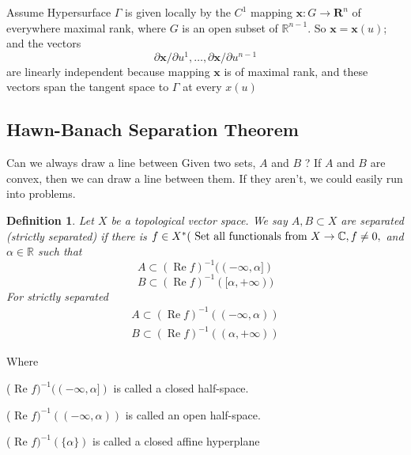 \documentclass[oneside]{book}
\newtheorem{mydef}{Definition}
\begin{document}
    
    
       Assume  Hypersurface $\Gamma$ is given locally by the $C^{1}$ mapping $\mathbf{x}: G \rightarrow \mathbf{R}^{n}$ of everywhere
maximal rank, where $G$ is an open subset of $\mathbb{R}^{n-1} .$ So $\mathbf{x}=\mathbf{x}(u)$; and the vectors \\
$$
\partial \mathbf{x} / \partial u^{1}, \ldots, \partial \mathbf{x} / \partial u^{n-1} 
$$
are linearly independent because  mapping $\mathbf{x}$ is of maximal rank, and these vectors span the tangent space to $\Gamma$ at every $x(u)$\\

\subsection{Hawn-Banach Separation Theorem}
\label{ss:11}
 Can we always draw a line between Given two sets, $ A$ and $ B$ ?
  If $ A$ and $ B$ are convex, then we can draw a line between them. If they aren't, we could easily run into problems.









\begin{mydef} 
Let $X$ be a topological vector space. We say $A, B \subset X$ are separated (strictly separated) if there is $f \in X^{*}(\text{ Set  all functionals from } \newline
 X \rightarrow \mathbb{C}, f \neq 0,$ and $\alpha \in \mathbb{R}$ such that
\[
A \subset(\operatorname{Re} f)^{-1}((-\infty, \alpha])
\]
\[
B \subset(\operatorname{Re} f)^{-1}([\alpha,+\infty))
\]
For strictly separated
\[
\begin{array}{l}
A \subset(\operatorname{Re} f)^{-1}((-\infty, \alpha)) \\
B \subset(\operatorname{Re} f)^{-1}((\alpha,+\infty))
\end{array}
\]
\end{mydef}

Where 
\hfill \ \break

\quad \quad \quad \quad \quad 
 ( Re $f)^{-1}((-\infty, \alpha])$ is called a closed half-space.
\newline

 \quad \quad \quad \quad \quad ( Re $f)^{-1}((-\infty, \alpha))$ is called an open half-space.
\newline

\quad \quad \quad \quad \quad ( Re $f)^{-1}(\{\alpha\})$ is called a closed affine hyperplane
\end{document}
